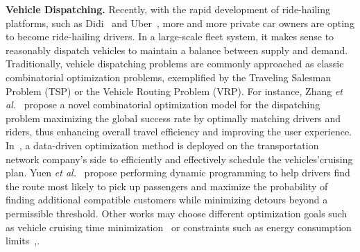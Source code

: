 
\smallskip
\noindent\textbf{Vehicle Dispatching.}
Recently, with the rapid development of ride-hailing platforms, such as Didi~\cite{DidiChuxing2020}
and Uber~\cite{Uber2020}, more and more private car owners are opting to become ride-hailing drivers. In a large-scale fleet system, it makes sense to reasonably dispatch vehicles to maintain a balance between supply and demand. Traditionally, vehicle dispatching problems are commonly approached as classic combinatorial optimization problems, exemplified by the Traveling Salesman Problem (TSP) or the Vehicle Routing Problem (VRP). 
For instance, Zhang \emph{et al.}~\cite{KDD17} propose a novel combinatorial optimization model for the dispatching problem maximizing the global success rate by optimally matching drivers and riders, thus enhancing overall travel efficiency and improving the user experience.
In~\cite{zhang2021data}, a data-driven optimization method is deployed on the transportation network company's side to efficiently and effectively schedule the vehicles’cruising plan.
Yuen \emph{et al.}~\cite{WWW19} propose performing dynamic programming to help drivers find the route most likely to pick up passengers and maximize the probability of finding additional compatible customers while minimizing detours beyond a permissible threshold.
Other works may choose different optimization goals such as vehicle cruising time minimization~\cite{Ubiquitous18} or constraints such as energy consumption limits~\cite{vehicle_dispatch_modle_based},\cite{ge2023towards}. 
